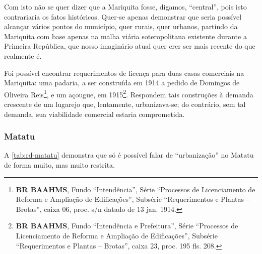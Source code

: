 Com isto não se quer dizer que a Mariquita fosse, digamos, ``central'', pois isto contrariaria os fatos históricos. Quer-se apenas demonstrar que seria possível alcançar vários pontos do município, quer rurais, quer urbanos, partindo da Mariquita com base apenas na malha viária soteropolitana existente durante a Primeira República, que nosso imaginário atual quer crer ser mais recente do que realmente é.


Foi possível encontrar requerimentos de licença para duas casas comerciais na Mariquita: uma padaria, a ser construída em 1914 a pedido de Domingos de Oliveira Reis\footnote{\textbf{BR BAAHMS}, Fundo ``Intendência'', Série ``Processos de Licenciamento de Reforma e Ampliação de Edificações'', Subsérie ``Requerimentos e Plantas -- Brotas'', caixa 06, proc. s/n datado de 13 jan. 1914.}, e um açougue, em 1915\footnote{\textbf{BR BAAHMS}, Fundo ``Intendência e Prefeitura'', Série ``Processos de Licenciamento de Reforma e Ampliação de Edificações'', Subsérie ``Requerimentos e Plantas -- Brotas'', caixa 23, proc. 195 fls. 208.}. Respondem tais construções à demanda crescente de um lugarejo que, lentamente, urbanizava-se; do contrário, sem tal demanda, sua viabilidade comercial estaria comprometida.












\subsubsection{Matatu}


A \autoref{tab:rd-matatu} demonstra que só é possível falar de ``urbanização'' no Matatu de forma muito, mas muito restrita.








